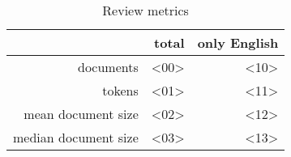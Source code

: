 \begin{table}[h]
    \centering
    \begin{tabular}{r|r|r}
    & total & only English\\\hline
        documents               & <00> & <10>\\
        tokens                  & <01> & <11>\\
        mean document size      & <02> & <12>\\
        median document size    & <03> & <13>
    \end{tabular}
    \caption{Review metrics}
    \label{tab:review_metrics}
\end{table}